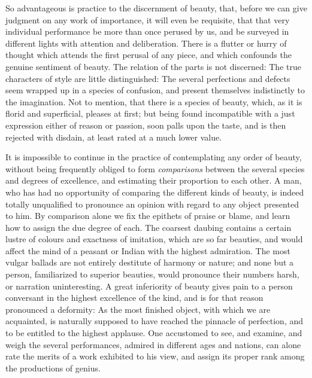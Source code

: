 So advantageous is practice to the discernment of beauty, that, before
we can give judgment on any work of importance, it will even be
requisite, that that very individual performance be more than once
perused by us, and be surveyed in different lights with attention and
deliberation. There is a flutter or hurry of thought which attends the
first perusal of any piece, and which confounds the genuine sentiment
of beauty. The relation of the parts is not discerned: The true
characters of style are little distinguished: The several perfections
and defects seem wrapped up in a species of confusion, and present
themselves indistinctly to the imagination. Not to mention, that there
is a species of beauty, which, as it is florid and superficial,
pleases at first; but being found incompatible with a just expression
either of reason or passion, soon palls upon the taste, and is then
rejected with disdain, at least rated at a much lower value.

It is impossible to continue in the practice of contemplating any
order of beauty, without being frequently obliged to form
\textit{comparisons} between the several species and degrees of
excellence, and estimating their proportion to each other. A man, who
has had no opportunity of comparing the different kinds of beauty, is
indeed totally unqualified to pronounce an opinion with regard to any
object presented to him. By comparison alone we fix the epithets of
praise or blame, and  learn how to assign the due degree of
each. The coarsest daubing contains a certain lustre of colours and
exactness of imitation, which are so far beauties, and would affect
the mind of a peasant or Indian with the highest admiration. The most
vulgar ballads are not entirely destitute of harmony or nature; and
none but a person, familiarized to superior beauties, would pronounce
their numbers harsh, or narration uninteresting. A great inferiority
of beauty gives pain to a person conversant in the highest excellence
of the kind, and is for that reason pronounced a deformity: As the
most finished object, with which we are acquainted, is naturally
supposed to have reached the pinnacle of perfection, and to be
entitled to the highest applause. One accustomed to see, and examine,
and weigh the several performances, admired in different ages and
nations, can alone rate the merits of a work exhibited to his view,
and assign its proper rank among the productions of genius.

